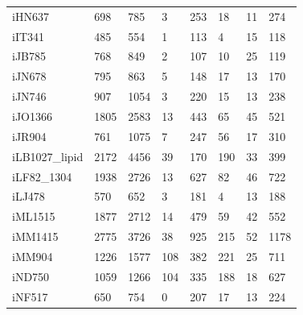 \documentclass[11pt, a4paper]{article}
\begin{document}
\begin{table}[!htbp]
{\begin{tabular}{|l|l|l|l|l|l|l|l|}
	iHN637 & 698 & 785 & 3 & 253 & 18 & 11 & 274 \\
	iIT341 & 485 & 554 & 1 & 113 & 4 & 15 & 118 \\
	iJB785 & 768 & 849 & 2 & 107 & 10 & 25 & 119 \\
	iJN678 & 795 & 863 & 5 & 148 & 17 & 13 & 170 \\
	iJN746 & 907 & 1054 & 3 & 220 & 15 & 13 & 238 \\
	iJO1366 & 1805 & 2583 & 13 & 443 & 65 & 45 & 521 \\
	iJR904 & 761 & 1075 & 7 & 247 & 56 & 17 & 310 \\
	iLB1027\_lipid & 2172 & 4456 & 39 & 170 & 190 & 33 & 399 \\
	iLF82\_1304 & 1938 & 2726 & 13 & 627 & 82 & 46 & 722 \\
	iLJ478 & 570 & 652 & 3 & 181 & 4 & 13 & 188 \\
	iML1515 & 1877 & 2712 & 14 & 479 & 59 & 42 & 552 \\
	iMM1415 & 2775 & 3726 & 38 & 925 & 215 & 52 & 1178 \\
	iMM904 & 1226 & 1577 & 108 & 382 & 221 & 25 & 711 \\
	iND750 & 1059 & 1266 & 104 & 335 & 188 & 18 & 627 \\
	iNF517 & 650 & 754 & 0 & 207 & 17 & 13 & 224 \\
	
\hline
\end{tabular}}
\end{table}
\end{document}
